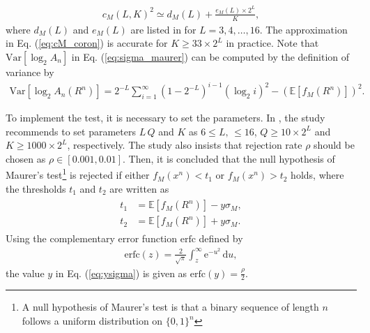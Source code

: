 \begin{align}\label{eq:cM_coron}
	c_M(L,K)^2 \simeq d_M(L) + \frac{e_M(L)\times2^L}{K}, 
\end{align} 
where $d_M(L)$ and $e_M(L)$ are listed in \cite{coron1998accurate} for $L=3,4,\dots,16$. 
The approximation in Eq. (\ref{eq:cM_coron}) is accurate for $K\geq 33\times 2^L$ in practice.
%
Note that $\mathrm{Var}[\log_2 A_n]$ in Eq. (\ref{eq:sigma_maurer}) can be computed by the definition of variance by
\begin{align}
 	\mathrm{Var}[\log_2 A_n(R^n)] = 2^{-L}\sum_{i=1}^{\infty}(1-2^{-L})^{i-1} (\log_2 i)^2 - (\mathbb{E}[f_M(R^n)])^2.
\end{align}
%
\par
%
To implement the test, it is necessary to set the parameters. In \cite{maurer1992universal}, the study recommends to set parameters $L\,Q$ and $K$ as $6\leq L,\, \leq 16$, $Q \geq 10 \times 2^L$ and $K \geq 1000\times 2^L$, respectively. 
%
The study also insists that rejection rate $\rho$ should be chosen as $\rho \in [0.001, 0.01]$. 
%
Then, it is concluded that the null hypothesis of Maurer's test\footnote{A null hypothesis of Maurer's test is that a binary sequence of length $n$ follows a uniform distribution on $\{0,1\}^n$} 
is rejected if either $f_M(x^n)<t_1$ or $f_M(x^n)>t_2$ holds, where the thresholds $t_1$ and $t_2$ are written as
\begin{align}\label{eq:ysigma}
\begin{split}
	t_1 &= \mathbb{E}[f_M(R^n)] - y\sigma_M, \\
	t_2 &= \mathbb{E}[f_M(R^n)] + y\sigma_M.
\end{split}
\end{align}
Using the complementary error function $\mathrm{erfc}$ defined by
\begin{align}
   \text{erfc}(z) = \frac{2}{\sqrt{\pi}} \int_{z}^{\infty} \mathrm{e}^{-u^2} \, \mathrm{d}u,
\end{align}
the value $y$ in Eq. (\ref{eq:ysigma}) is given as $\mathrm{erfc}(y)=\frac{\rho}{2}$. 
